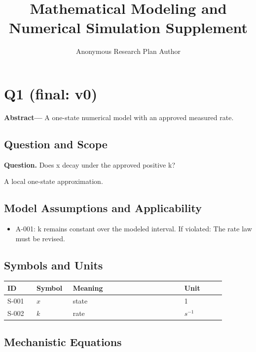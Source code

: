 \documentclass[11pt]{article}
\title{Mathematical Modeling and Numerical Simulation Supplement}
\author{Anonymous Research Plan Author}
\date{}
\begin{document}
\setlength{\emergencystretch}{3em}

\maketitle

\section{Q1 (final: v0)}

\noindent\textbf{Abstract—} A one-state numerical model with an approved measured rate.

\subsection{Question and Scope}

\noindent\textbf{Question.} Does x decay under the approved positive k?



A local one-state approximation.

\subsection{Model Assumptions and Applicability}

\begin{itemize}\raggedright
\item A-001: k remains constant over the modeled interval. If violated: The rate law must be revised.
\end{itemize}

\subsection{Symbols and Units}

\begin{center}
\small
\begin{tabular}{|p{0.12\linewidth}|p{0.15\linewidth}|p{0.46\linewidth}|p{0.17\linewidth}|}
\hline
ID & Symbol & Meaning & Unit \\ \hline
S-001 & $x$ & state & 1 \\ \hline
S-002 & $k$ & rate & $s^{-1}$ \\ \hline
\end{tabular}
\end{center}

\subsection{Mechanistic Equations}
\end{document}
